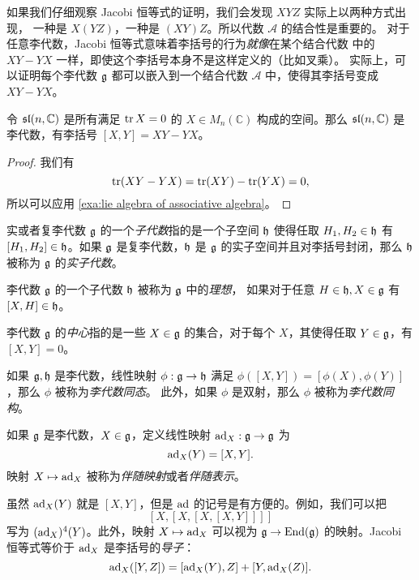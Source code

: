 如果我们仔细观察 Jacobi 恒等式的证明，我们会发现 $XYZ$ 实际上以两种方式出现，
一种是 $X(YZ)$，一种是 $(XY)Z$。所以代数 $\mathcal A$ 的结合性是重要的。
对于任意李代数，Jacobi 恒等式意味着李括号的行为\emph{就像}在某个结合代数
中的 $XY-YX$ 一样，即使这个李括号本身不是这样定义的（比如叉乘）。
实际上，可以证明每个李代数 $\mathfrak{g}$ 都可以嵌入到一个结合代数 $\mathcal A$
中，使得其李括号变成 $XY-YX$。

\begin{example}
  令 $\mathfrak{sl}(n,\mathbb{C})$ 是所有满足 $\operatorname{tr} X=0$ 的 $X\in M_n(\mathbb{C})$
  构成的空间。那么 $\mathfrak{sl}(n,\mathbb{C})$ 是李代数，有李括号
  $[X,Y]=XY-YX$。
\end{example}
\begin{proof}
  我们有
  \[
    \operatorname{tr}(XY-YX)=\operatorname{tr}(XY)-\operatorname{tr}(YX)=0,
  \]
  所以可以应用 \autoref{exa:lie algebra of associative algebra}。
\end{proof}

\begin{definition}
  实或者复李代数 $\mathfrak{g}$ 的一个\emph{子代数}指的是一个子空间 $\mathfrak{h}$
  使得任取 $H_1,H_2\in\mathfrak{h}$ 有 $[H_1,H_2]\in\mathfrak{h}$。如果 $\mathfrak{g}$
  是复李代数，$\mathfrak{h}$ 是 $\mathfrak{g}$ 的实子空间并且对李括号封闭，那么
  $\mathfrak{h}$ 被称为 $\mathfrak{g}$ 的\emph{实子代数}。

  李代数 $\mathfrak{g}$ 的一个子代数 $\mathfrak{h}$ 被称为 $\mathfrak{g}$ 中的\emph{理想}，
  如果对于任意 $H\in \mathfrak{h},X\in\mathfrak{g}$ 有 $[X,H]\in\mathfrak{h}$。

  李代数 $\mathfrak{g}$ 的\emph{中心}指的是一些 $X\in\mathfrak{g}$ 的集合，对于每个
  $X$，其使得任取 $Y\in\mathfrak{g}$，有 $[X,Y]=0$。
\end{definition}

\begin{definition}
  如果 $\mathfrak{g},\mathfrak{h}$ 是李代数，线性映射 $\phi:\mathfrak{g}\to\mathfrak{h}$ 
  满足 $\phi([X,Y])=[\phi(X),\phi(Y)]$，那么 $\phi$ 被称为\emph{李代数同态}。
  此外，如果 $\phi$ 是双射，那么 $\phi$ 被称为\emph{李代数同构}。
\end{definition}

\begin{definition}
  如果 $\mathfrak{g}$ 是李代数，$X\in\mathfrak{g}$，定义线性映射 $\operatorname{ad}_X:\mathfrak{g}\to\mathfrak{g}$
  为 
  \[
    \operatorname{ad}_X(Y)=[X,Y].
  \]
  映射 $X\mapsto \operatorname{ad}_X$ 被称为\emph{伴随映射}或者\emph{伴随表示}。
\end{definition}

虽然 $\operatorname{ad}_X(Y)$ 就是 $[X,Y]$，但是 $\operatorname{ad}$ 的记号是有方便的。例如，我们可以把
\[ 
[X,[X,[X,[X,Y]]]]
\]  
写为 $(\operatorname{ad}_X)^4(Y)$。此外，映射 $X\mapsto \operatorname{ad}_X$ 可以视为 $\mathfrak{g}\to\operatorname{End}(\mathfrak{g})$
的映射。Jacobi 恒等式等价于 $\operatorname{ad}_X$ 是李括号的\emph{导子}：
\begin{equation}\label{eq:Jacobi identity of ad}
  \operatorname{ad}_X([Y,Z])=[\operatorname{ad}_X(Y),Z]+[Y,\operatorname{ad}_X(Z)].
\end{equation}

